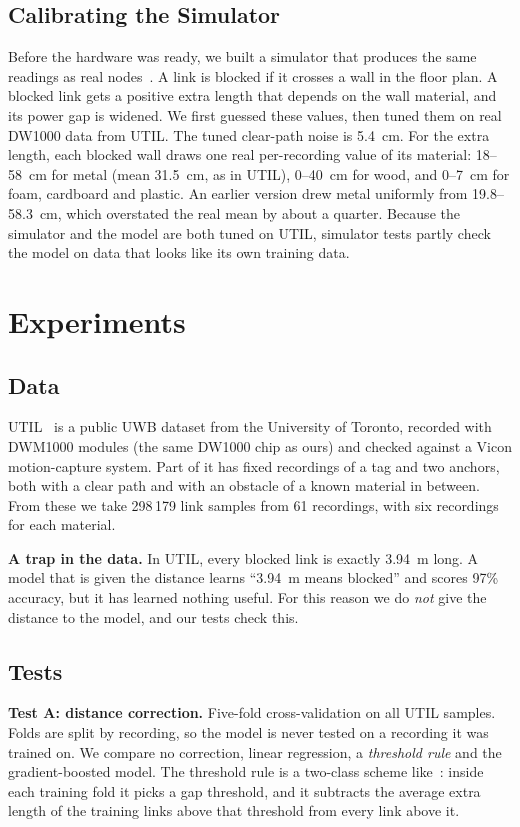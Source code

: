 \documentclass[conference]{IEEEtran}
\begin{document}
\subsection{Calibrating the Simulator}
Before the hardware was ready, we built a simulator that produces the same
readings as real nodes~\cite{paszek2021simulator}. A link is blocked if it
crosses a wall in the floor plan. A blocked link gets a positive extra
length that depends on the wall material, and its power gap is widened.
We first guessed these values, then tuned them on real DW1000 data from
UTIL. The tuned clear-path noise is 5.4~cm. For the extra length, each
blocked wall draws one real per-recording value of its material: 18--58~cm
for metal (mean 31.5~cm, as in UTIL), 0--40~cm for wood, and 0--7~cm for
foam, cardboard and plastic. An earlier version drew metal uniformly from
19.8--58.3~cm, which overstated the real mean by about a quarter. Because the
simulator and the model are both tuned on UTIL, simulator tests partly check
the model on data that looks like its own training data.

\section{Experiments}

\subsection{Data}
UTIL~\cite{zhao2024util} is a public UWB dataset from the University of
Toronto, recorded with DWM1000 modules (the same DW1000 chip as ours) and
checked against a Vicon motion-capture system. Part of it has fixed
recordings of a tag and two anchors, both with a clear path and with an
obstacle of a known material in between. From these we take 298\,179 link
samples from 61 recordings, with six recordings for each material.

\textbf{A trap in the data.} In UTIL, every blocked link is exactly
3.94~m long. A model that is given the distance learns ``3.94~m means
blocked'' and scores 97\% accuracy, but it has learned nothing useful.
For this reason we do \emph{not} give the distance to the model, and our
tests check this.

\subsection{Tests}
\textbf{Test A: distance correction.} Five-fold cross-validation on all
UTIL samples. Folds are split by recording, so the model is never tested on
a recording it was trained on. We compare no correction, linear regression,
a \emph{threshold rule} and the gradient-boosted model. The threshold rule
is a two-class scheme like~\cite{kolakowski2017first}: inside each training
fold it picks a gap threshold, and it subtracts the average extra length of
the training links above that threshold from every link above it.
\end{document}
